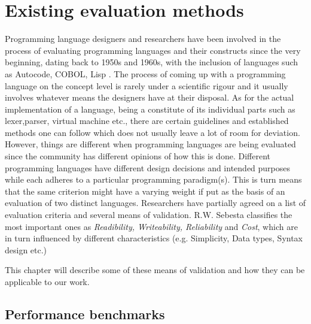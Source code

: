 \chapter{Existing evaluation methods}
\label{chap:eval_methods}

Programming language designers and researchers have been involved in the process of evaluating programming languages and their constructs since the very beginning, dating back to 1950s and 1960s, with the inclusion of languages such as Autocode, COBOL, Lisp \cite{PLHistory}. The process of coming up with a programming language on the concept level is rarely under a scientific rigour and it usually involves whatever means the designers have at their disposal. As for the actual implementation of a language, being a constitute of its individual parts such as lexer,parser, virtual machine etc., there are certain guidelines and established methods one can follow which does not usually leave a lot of room for deviation. However, things are different when programming languages are being evaluated since the community has different opinions of how this is done. Different programming languages have different design decisions and intended purposes while each adheres to a particular programming paradigm(s). This is turn means that the same criterion might have a varying weight if put as the basis of an evaluation of two distinct languages. Researchers have partially agreed on a list of evaluation criteria and several means of validation. R.W. Sebesta \cite{Sebesta} classifies the most important ones as \textit{Readibility, Writeability, Reliability} and \textit{Cost}, which are in turn influenced by different characteristics (e.g. Simplicity, Data types, Syntax design etc.)

This chapter will describe some of these means of validation and how they can be applicable to our work.

\section{Performance benchmarks}

